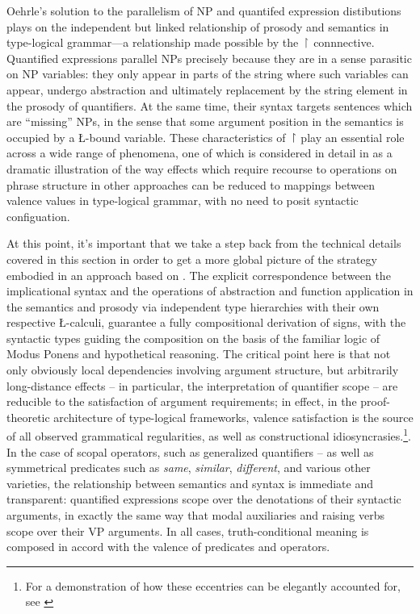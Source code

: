 \documentclass[output=paper,colorlinks,citecolor=brown]{langscibook}
\begin{document}
Oehrle's solution to the parallelism of NP and quantifed expression
distibutions plays on the independent but linked relationship of
prosody and semantics in type-logical grammar—a relationship made
possible by the \ensuremath{\vs} connnective. Quantified expressions parallel NPs
precisely because they are in a sense parasitic on NP variables: they
only appear in parts of the string where such variables can appear,
undergo abstraction and ultimately replacement by the string element
in the prosody of quantifiers. At the same time, their syntax targets
sentences which are ``missing'' NPs, in the sense that some argument
position in the semantics is occupied by a \L-bound variable. These
characteristics of \ensuremath{\vs} play an essential role across a wide range of
phenomena, one of which is considered in detail in  as
a dramatic illustration of the way effects which require recourse to
operations on phrase structure in other approaches can be reduced to
mappings between valence values in type-logical grammar, with no need
to posit syntactic configuation.



At this point, it's important that we take a step back from the
technical details covered in this section in order to get a more
global picture of the strategy embodied in an approach based on
. The explicit correspondence between the implicational syntax
and the operations of abstraction and function application in the
semantics and prosody via independent type hierarchies with their own
respective \L-calculi, guarantee a fully compositional derivation of
signs, with the syntactic types guiding the composition on the basis
of the familiar logic of Modus Ponens and hypothetical reasoning. The
critical point here is that not only obviously local dependencies
involving argument structure, but arbitrarily long-distance
effects -- in particular, the interpretation of quantifier scope -- are
reducible to the satisfaction of argument requirements; in effect, in
the proof-theoretic architecture of type-logical frameworks, valence
satisfaction is the source of all observed grammatical regularities,
as well as constructional idiosyncrasies.\footnote{For
a demonstration of how these eccentries can be elegantly accounted
for, see \citet{kubota-levine2022a}}. In the case of scopal operators, such
as generalized quantifiers -- as well as symmetrical predicates such as
\textit{same}, \textit{similar}, \textit{different}, and various other varieties, the
relationship between semantics and syntax is immediate and
transparent: quantified expressions scope over the denotations of
their syntactic arguments, in exactly the same way that modal
auxiliaries and raising verbs scope over their VP arguments. In all
cases, truth-conditional meaning is composed in accord with the
valence of predicates and operators.
\end{document}
